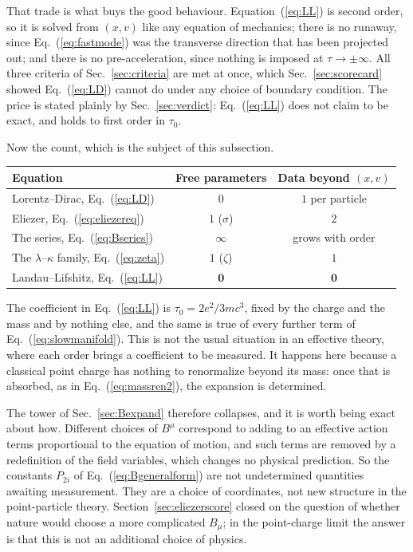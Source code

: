 \documentclass[preprint]{aastex701}
\newcommand{\taunought}{\tau_0}
\begin{document}
That trade is what buys the good behaviour. Equation~(\ref{eq:LL}) is second
order, so it is solved from $(x,v)$ like any equation of mechanics; there is no
runaway, since Eq.~(\ref{eq:fastmode}) was the transverse direction that has
been projected out; and there is no pre-acceleration, since nothing is imposed
at $\tau\to\pm\infty$. All three criteria of Sec.~\ref{sec:criteria} are met at
once, which Sec.~\ref{sec:scorecard} showed Eq.~(\ref{eq:LD}) cannot do under
any choice of boundary condition. The price is stated plainly by
Sec.~\ref{sec:verdict}: Eq.~(\ref{eq:LL}) does not claim to be exact, and holds
to first order in $\taunought$.

\medskip

Now the count, which is the subject of this subsection.

\begin{center}
\begin{tabular}{lcc}
\toprule
Equation & Free parameters & Data beyond $(x,v)$ \\
\midrule
Lorentz--Dirac, Eq.~(\ref{eq:LD})      & $0$      & $1$ per particle \\
Eliezer, Eq.~(\ref{eq:eliezereq})      & $1$ ($\sigma$) & $2$ \\
The series, Eq.~(\ref{eq:Bseries})     & $\infty$ & grows with order \\
The $\lambda$--$\kappa$ family, Eq.~(\ref{eq:zeta}) & $1$ ($\zeta$) & $1$ \\
Landau--Lifshitz, Eq.~(\ref{eq:LL})    & $\mathbf 0$ & $\mathbf 0$ \\
\bottomrule
\end{tabular}
\end{center}

\medskip

The coefficient in Eq.~(\ref{eq:LL}) is $\taunought = 2e^2/3mc^3$, fixed by the
charge and the mass and by nothing else, and the same is true of every further
term of Eq.~(\ref{eq:slowmanifold}). This is not the usual situation in an
effective theory, where each order brings a coefficient to be measured. It
happens here because a classical point charge has nothing to renormalize beyond
its mass: once that is absorbed, as in Eq.~(\ref{eq:massren2}), the expansion is
determined.

The tower of Sec.~\ref{sec:Bexpand} therefore collapses, and it is worth being
exact about how. Different choices of $B^\mu$ correspond to adding to an
effective action terms proportional to the equation of motion, and such terms
are removed by a redefinition of the field variables, which changes no physical
prediction. So the constants $P_{2i}$ of Eq.~(\ref{eq:Bgeneralform}) are not
undetermined quantities awaiting measurement. They are a choice of coordinates,
not new structure in the point-particle theory. Section~\ref{sec:eliezerscore}
closed on the question of whether nature would choose a more complicated
$B_\mu$; in the point-charge limit the answer is that this is not an additional
choice of physics.
\end{document}
